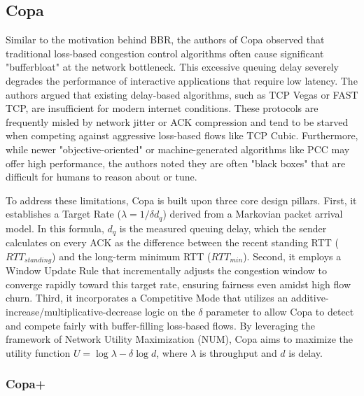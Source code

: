 \subsection{Copa}

Similar to the motivation behind BBR, the authors of Copa observed that traditional loss-based congestion control algorithms often cause significant "bufferbloat" at the network bottleneck\cite{COPA}. 
This excessive queuing delay severely degrades the performance of interactive applications that require low latency\cite{COPA}. 
The authors argued that existing delay-based algorithms, such as TCP Vegas or FAST TCP, are insufficient for modern internet conditions\cite{COPA}.
These protocols are frequently misled by network jitter or ACK compression and tend to be starved when competing against aggressive loss-based flows like TCP Cubic\cite{COPA}. 
Furthermore, while newer "objective-oriented" or machine-generated algorithms like PCC may offer high performance, the authors noted they are often "black boxes" that are difficult for humans to reason about or tune\cite{COPA}.

To address these limitations, Copa is built upon three core design pillars\cite{COPA}. 
First, it establishes a Target Rate ($\lambda = 1/\delta d_q$) derived from a Markovian packet arrival model\cite{COPA}. 
In this formula, $d_q$ is the measured queuing delay, which the sender calculates on every ACK as the difference between the recent standing RTT ($RTT_{standing}$) and the long-term minimum RTT ($RTT_{min}$)\cite{COPA}. 
Second, it employs a Window Update Rule that incrementally adjusts the congestion window to converge rapidly toward this target rate, ensuring fairness even amidst high flow churn\cite{COPA}. 
Third, it incorporates a Competitive Mode that utilizes an additive-increase/multiplicative-decrease logic on the $\delta$ parameter to allow Copa to detect and compete fairly with buffer-filling loss-based flows\cite{COPA}. 
By leveraging the framework of Network Utility Maximization (NUM), Copa aims to maximize the utility function $U = \log \lambda - \delta \log d$, where $\lambda$ is throughput and $d$ is delay\cite{COPA}.

\subsubsection{Copa+}

